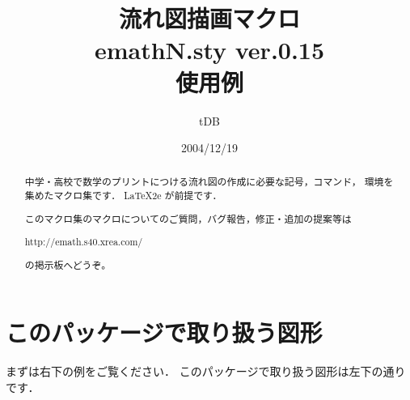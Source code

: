 \documentclass[a4j]{jarticle}
\begin{document}
\title{流れ図描画マクロ\\
emathN.sty {\normalsize ver.0.15}\\使用例}
\author{tDB}
\date{2004/12/19}

\maketitle\thispagestyle{empty}
\begin{abstract}%
\zw%
中学・高校で数学のプリントにつける流れ図の作成に必要な記号，コマンド，
環境を集めたマクロ集です．
\LaTeX2e が前提です．

このマクロ集のマクロについてのご質問，バグ報告，修正・追加の提案等は
\begin{center}
http://emath.s40.xrea.com/
\end{center}
の掲示板へどうぞ。
\end{abstract}
\pagebreak
{}%

\tableofcontents

\pagebreak


\section{このパッケージで取り扱う図形}
まずは右下の例をご覧ください．
このパッケージで取り扱う図形は左下の通りです．\bigskip
\end{document}
